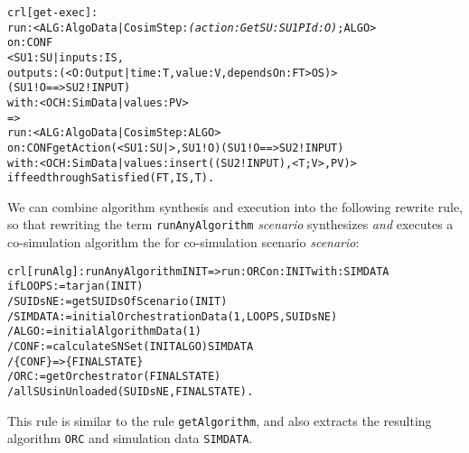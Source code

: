 \scriptsize
\begin{alltt}
crl [get-exec] : 
    run: < ALG : AlgoData | CosimStep : \emph{(action: Get SU: SU1 PId: O)} ; ALGO >
    on: CONF
      < SU1 : SU | inputs : IS,
                   outputs : (< O : Output | time : T, value : V, dependsOn : FT > OS) > 
      ( SU1 ! O ==> SU2 ! INPUT)
    with: < OCH : SimData | values : PV >
    => 
    run: < ALG : AlgoData | CosimStep : ALGO >
    on: CONF getAction(< SU1 : SU | >, SU1 ! O) ( SU1 ! O ==> SU2 ! INPUT)
    with: < OCH : SimData | values : insert((SU2 ! INPUT), < T ; V >, PV) > 
 if feedthroughSatisfied(FT, IS, T) .
\end{alltt}
\normalsize


We can combine algorithm synthesis and execution into the following
rewrite rule, so that rewriting the term \texttt{runAnyAlgorithm}
\emph{scenario} synthesizes \emph{and} executes a co-simulation
algorithm the for co-simulation scenario \emph{scenario}: 

\small
\begin{alltt}
crl [runAlg] : runAnyAlgorithm INIT => run: ORC on: INIT with: SIMDATA
  if LOOPS := tarjan(INIT)
  / SUIDsNE := getSUIDsOfScenario(INIT)
  / SIMDATA := initialOrchestrationData(1,LOOPS,SUIDsNE)
  / ALGO := initialAlgorithmData(1)
  / CONF := calculateSNSet(INIT ALGO) SIMDATA 
  / \{CONF\} => \{FINALSTATE\} 
  / ORC := getOrchestrator(FINALSTATE)
  / allSUsinUnloaded(SUIDsNE, FINALSTATE) .
\end{alltt}
\normalsize

\noindent 
This rule is similar to the rule \texttt{getAlgorithm}, and also
extracts the resulting algorithm \texttt{ORC} and simulation data
\texttt{SIMDATA}. 

